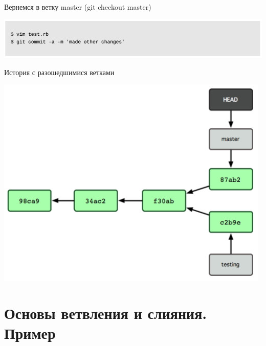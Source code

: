 \documentclass{beamer}
\begin{document}
\begin{frame}
\begin{block}{Вернемся в ветку master (git checkout master)}
\begin{center}
\includegraphics[scale=0.5]{images/branch-12.png}
\end{center}
\end{block}
\begin{block}{История с разошедшимися ветками}
\begin{center}
\includegraphics[scale=0.5]{images/branch-13.png}
\end{center}
\end{block}
\end{frame}

\section{Основы ветвления и слияния. Пример}
\end{document}
